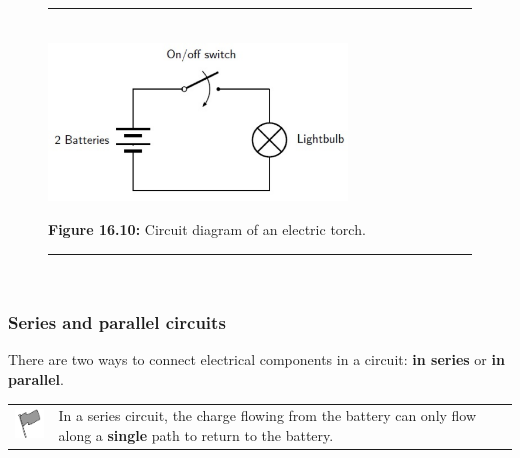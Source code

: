 	\begin{figure}[H] %
    \begin{center}
    \rule[.1in]{\figurerulewidth}{.005in} \\
        \label{m38771*uid15!!!underscore!!!media}\label{m38771*uid15!!!underscore!!!printimage}\includegraphics[width=300px]{col11305.imgs/m38771_PG10C9_010.png} %
        
      \vspace{2pt}
    \vspace{\rubberspace}\par \begin{cnxcaption}
	  \small \textbf{Figure 16.10: }Circuit diagram of an electric torch.
	\end{cnxcaption}
      
    \vspace{.1in}
    \rule[.1in]{\figurerulewidth}{.005in} \\
        
    \end{center}

 \end{figure}   

    \addtocounter{footnote}{-0}
    
        
        \label{m38771*uid16}
            \subsubsection{ Series and parallel circuits}
            \nopagebreak
            
          
          \label{m38771*id63292}There are two ways to connect electrical components in a circuit: \textbf{in series} or \textbf{in parallel}.\par 
\label{m38771*fhsst!!!underscore!!!id283}\begin{definition}
	  \begin{tabular*}{15 cm}{m{15 mm}m{}}
	\hspace*{-50pt}  \includegraphics[width=0.5in]{col11305.imgs/psflag2.png}   & \Definition{   \label{id2478736}\textbf{ Series circuit }} { \label{m38771*meaningfhsst!!!underscore!!!id283}
          \label{m38771*id63313}In a series circuit, the charge flowing from the battery can only flow along a \textbf{single} path to return to the battery. \par 
           } 
      \end{tabular*}
      \end{definition}

